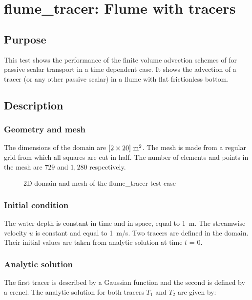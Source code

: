 \chapter{flume\_tracer: Flume with tracers}
%

\section{Purpose}
This test shows the performance of the finite volume advection schemes of  for passive scalar transport in a time dependent case.
It shows the advection of a tracer (or any other passive scalar) in a flume with flat frictionless bottom.

\section{Description}

\subsection{Geometry and mesh}

The dimensions of the domain are $[2 \times 20]~\rm{m}^2$.
The mesh is made from a regular grid from which all squares are cut in half.
The number of elements and points in the mesh are $729$ and $1,280$ respectively.

\begin{figure}[h!]
\centering
{}
\caption{2D domain and mesh of the flume\_tracer test case}
\label{t2d:flumetracer:mesh}
\end{figure}

\subsection{Initial condition}

The water depth is constant in time and in space, equal to 1~m. The streamwise velocity $u$ is constant and equal to 1~m/s.
Two tracers are defined in the domain. Their initial values are taken from analytic solution at time $t$ = 0.

\subsection{Analytic solution}

The first tracer is described by a Gaussian function and the second is defined by a crenel.
The analytic solution for both tracers $T_1$ and $T_2$ are given by:

